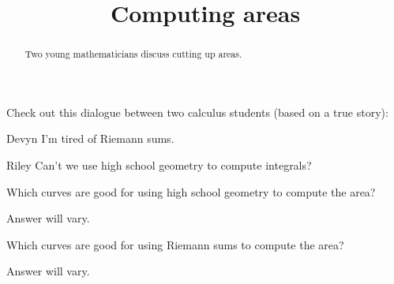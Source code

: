 \documentclass{ximera}
\title[Break-Ground:]{Computing areas}
\begin{document}
\begin{abstract}
Two young mathematicians discuss cutting up areas.
\end{abstract}
\maketitle

Check out this dialogue between two calculus students (based on a true
story):



\begin{dialogue}
\item[Devyn] I'm tired of Riemann sums.
\item[Riley] Can't we use high school geometry to compute integrals?
\end{dialogue}

\begin{problem}
  Which curves are good for using high school geometry to compute the area?
  \begin{freeResponse}
    Answer will vary.
  \end{freeResponse}
\end{problem}

\begin{problem}
  Which curves are good for using Riemann sums to compute the area?
  \begin{freeResponse}
    Answer will vary.
  \end{freeResponse}
\end{problem}



%
\end{document}
